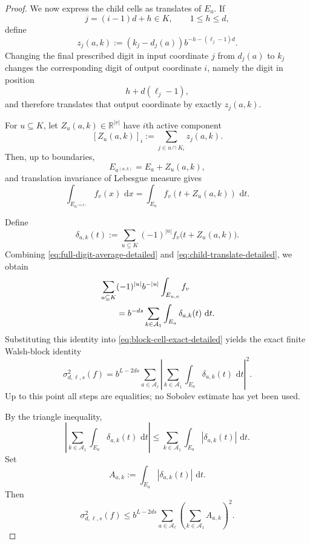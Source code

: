 \documentclass[10pt,a4paper]{amsart}
\newcommand{\dd}{\,\mathrm d}
\begin{document}
\begin{proof}
We now express the child cells as translates of $E_a$.
If
\[
 j=(i-1)d+h\in K,
 \qquad 1\le h\le d,
\]
define
\begin{equation}\label{eq:z-aj-detailed}
 z_j(a,k)
 :=
 (k_j-d_j(a))b^{-h-(\ell_j-1)d}.
\end{equation}
Changing the final prescribed digit in input coordinate $j$ from
$d_j(a)$ to $k_j$ changes the corresponding digit of output
coordinate $i$, namely the digit in position
\[
 h+d(\ell_j-1),
\]
and therefore translates that output coordinate by exactly
$z_j(a,k)$.

For $u\subseteq K$, let $Z_u(a,k)\in\mathbb R^{|v|}$ have
$i$th active component
\[
 [Z_u(a,k)]_i
 :=
 \sum_{j\in u\cap K_i}z_j(a,k).
\]
Then, up to boundaries,
\[
 E_{a^{(u,k)}}=E_a+Z_u(a,k),
\]
and translation invariance of Lebesgue measure gives
\begin{equation}\label{eq:child-translate-detailed}
 \int_{E_{a^{(u,k)}}}f_v(x)\,\dd x
 =
 \int_{E_a}f_v(t+Z_u(a,k))\,\dd t.
\end{equation}

Define
\begin{equation}\label{eq:delta-explicit-detailed}
 \delta_{a,k}(t)
 :=
 \sum_{u\subseteq K}(-1)^{|u|}
 f_v\bigl(t+Z_u(a,k)\bigr).
\end{equation}
Combining
\eqref{eq:full-digit-average-detailed} and
\eqref{eq:child-translate-detailed}, we obtain
\begin{align}
 &\sum_{u\subseteq K}
 (-1)^{|u|}b^{-|u|}
 \int_{E_{u,a}}f_v
 \notag\\
 &\qquad
 =
 b^{-ds}
 \sum_{k\in\mathcal A_1}
 \int_{E_a}\delta_{a,k}(t)\,\dd t.
 \label{eq:block-difference-rearrangement-detailed}
\end{align}
Substituting this identity into
\eqref{eq:block-cell-exact-detailed} yields the exact finite
Walsh-block identity
\begin{equation}\label{eq:block-exact-detailed}
 \sigma_{d,\boldsymbol\ell,s}^2(f)
 =
 b^{L-2ds}
 \sum_{a\in\mathcal A_{\boldsymbol\ell}}
 \left|
   \sum_{k\in\mathcal A_1}
   \int_{E_a}\delta_{a,k}(t)\,\dd t
 \right|^2.
\end{equation}
Up to this point all steps are equalities; no Sobolev estimate has
yet been used.

By the triangle inequality,
\[
 \left|
   \sum_{k\in\mathcal A_1}
   \int_{E_a}\delta_{a,k}(t)\,\dd t
 \right|
 \le
 \sum_{k\in\mathcal A_1}
 \int_{E_a}|\delta_{a,k}(t)|\,\dd t.
\]
Set
\[
 A_{a,k}
 :=
 \int_{E_a}|\delta_{a,k}(t)|\,\dd t.
\]
Then
\begin{equation}\label{eq:before-max-detailed}
 \sigma_{d,\boldsymbol\ell,s}^2(f)
 \le
 b^{L-2ds}
 \sum_{a\in\mathcal A_{\boldsymbol\ell}}
 \left(
   \sum_{k\in\mathcal A_1}A_{a,k}
 \right)^2.
\end{equation}


\end{proof}
\end{document}
